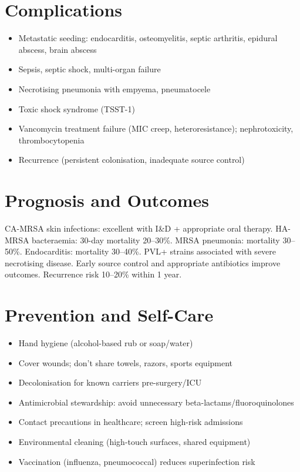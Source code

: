 \section*{Complications}
\begin{itemize}
    \item Metastatic seeding: endocarditis, osteomyelitis, septic arthritis, epidural abscess, brain abscess
    \item Sepsis, septic shock, multi-organ failure
    \item Necrotising pneumonia with empyema, pneumatocele
    \item Toxic shock syndrome (TSST-1)
    \item Vancomycin treatment failure (MIC creep, heteroresistance); nephrotoxicity, thrombocytopenia
    \item Recurrence (persistent colonisation, inadequate source control)
\end{itemize}

\section*{Prognosis and Outcomes}
CA-MRSA skin infections: excellent with I\&D + appropriate oral therapy. HA-MRSA bacteraemia: 30-day mortality 20--30\%. MRSA pneumonia: mortality 30--50\%. Endocarditis: mortality 30--40\%. PVL+ strains associated with severe necrotising disease. Early source control and appropriate antibiotics improve outcomes. Recurrence risk 10--20\% within 1 year.

\section*{Prevention and Self-Care}
\begin{itemize}
    \item Hand hygiene (alcohol-based rub or soap/water)
    \item Cover wounds; don't share towels, razors, sports equipment
    \item Decolonisation for known carriers pre-surgery/ICU
    \item Antimicrobial stewardship: avoid unnecessary beta-lactams/fluoroquinolones
    \item Contact precautions in healthcare; screen high-risk admissions
    \item Environmental cleaning (high-touch surfaces, shared equipment)
    \item Vaccination (influenza, pneumococcal) reduces superinfection risk
\end{itemize}

